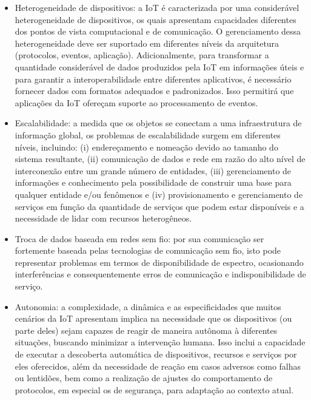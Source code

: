 \documentclass[tid,table]{texufpel} %
\begin{document}
\begin{itemize}

\item Heterogeneidade de dispositivos: a IoT é caracterizada por uma considerável heterogeneidade de dispositivos, os quais apresentam capacidades diferentes dos pontos de vista computacional e de comunicação. O gerenciamento dessa heterogeneidade deve ser suportado em diferentes níveis da arquitetura (protocolos, eventos, aplicação). Adicionalmente, para transformar a quantidade considerável de dados produzidos pela IoT em informações úteis e para garantir a interoperabilidade entre diferentes aplicativos, é necessário fornecer dados com formatos adequados e padronizados. Isso permitirá que aplicações da IoT ofereçam suporte ao processamento de eventos.

\item Escalabilidade: a medida que os objetos se conectam a uma infraestrutura de informação global, os problemas de escalabilidade surgem em diferentes níveis, incluindo: (i) endereçamento e nomeação devido ao tamanho do sistema resultante, (ii) comunicação de dados e rede em razão do alto nível de interconexão entre um grande número de entidades, (iii) gerenciamento de informações e conhecimento pela possibilidade de construir uma base para qualquer entidade e/ou fenômenos e (iv) provisionamento e gerenciamento de serviços em função da quantidade de serviços que podem estar disponíveis e a necessidade de lidar com recursos heterogêneos.

\item Troca de dados baseada em redes sem fio: por sua comunicação ser fortemente baseada pelas tecnologias de comunicação sem fio, isto pode representar problemas em termos de disponibilidade de espectro, ocasionando interferências e consequentemente erros de comunicação e indisponibilidade de serviço.

\item Autonomia: a complexidade, a dinâmica e as especificidades que muitos cenários da IoT apresentam implica na necessidade que os dispositivos (ou parte deles) sejam capazes de reagir de maneira autônoma à diferentes situações, buscando minimizar a intervenção humana. Isso inclui a capacidade de executar a descoberta automática de dispositivos, recursos e serviços por eles oferecidos, além da necessidade de reação em casos adversos como falhas ou lentidões, bem como a realização de ajustes do comportamento de protocolos, em especial os de segurança, para adaptação ao contexto atual.


\end{itemize}
\end{document}
